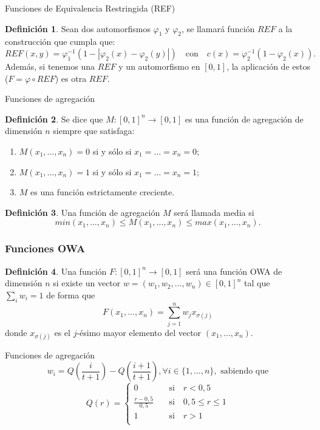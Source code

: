 \documentclass{beamer}
\theoremstyle{plain} %
\theoremstyle{definition}
\newtheorem{defn}{Definición}
\def\unitinterval{[0,1]}
\begin{document}
\begin{frame}{Funciones de Equivalencia Restringida (REF)}
  \begin{defn}\label{prop:contruccionref}
  Sean dos automorfismos $\varphi_{1}$ y $\varphi_{2}$, se llamará función $REF$ a la construcción que cumpla que: 
  $$REF(x,y) = \varphi_1^{-1}(1-|\varphi_2(x)-\varphi_2(y)|) \quad\text{con}\quad c(x) = \varphi_2^{-1}(1-\varphi_2(x)).$$ 
  Además, si tenemos una $REF$ y un automorfismo en $\unitinterval$, la aplicación de estos ($F=\varphi \circ REF$) es otra $REF$.
  \end{defn}
\end{frame}

\begin{frame}{Funciones de agregación}
  \begin{defn}\label{def:agregacion}
  Se dice que $M : \unitinterval^n \rightarrow \unitinterval$ es una función de agregación de dimensión $n$ siempre que satisfaga:
    \begin{enumerate}
    \item $M(x_1, \dots, x_n) = 0$ si y sólo si $x_1=\dots=x_n=0$;
    \item $M(x_1, \dots, x_n) = 1$ si y sólo si $x_1=\dots=x_n=1$;
    \item $M$ es una función estrictamente creciente.
    \end{enumerate}
  \end{defn}
  \begin{defn}
  Una función de agregación $M$ será llamada media si
  $$ min(x_{1}, \dots, x_{n})  \leq M(x_{1}, \dots, x_{n}) \leq max(x_{1}, \dots, x_{n}).$$
  \end{defn}
\end{frame}

\begin{frame}
  \frametitle{Funciones OWA}
  \begin{defn}\label{def:owa}
  Una  función $F:\unitinterval^n\rightarrow\unitinterval$ será una función OWA de dimensión $n$ si existe un vector $w=(w_{1},w_{2},\dots,w_{n})\in \unitinterval^{n}$ tal que $\sum_{i}w_{i}=1$ de forma que
  $$F(x_{1},\dots,x_{n})=\sum^{n}_{j=1}w_{j}x_{\sigma(j)}$$
  donde $x_{\sigma(j)}$ es el $j$-ésimo mayor elemento del vector $(x_{1},\dots,x_{n})$.
  \end{defn}
\end{frame}
\begin{frame}{Funciones de agregación}
  \begin{equation*}\label{eq:pesosowamayoria}
   w_i = Q\left(\frac{i}{t+1}\right) - Q\left(\frac{i+1}{t+1}\right), \forall i\in \{1, \dots, n\}, \text{   sabiendo que}
  \end{equation*}
   $$Q(r) = \left\{\begin{aligned}
    0           &\quad \text{si}\quad r<0,5\\
    \frac{r-0,5}{0,5} &\quad \text{si}\quad 0,5\leq r\leq 1\\
    1           &\quad \text{si}\quad r>1\\
  \end{aligned}\right.$$
\end{frame}
\end{document}

